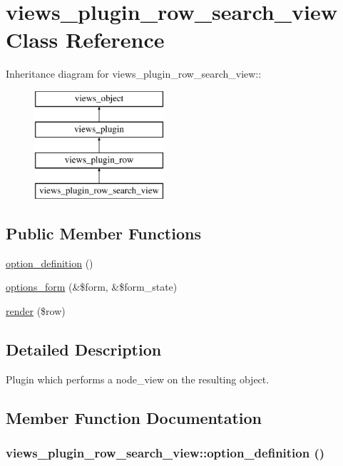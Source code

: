 \hypertarget{classviews__plugin__row__search__view}{
\section{views\_\-plugin\_\-row\_\-search\_\-view Class Reference}
\label{classviews__plugin__row__search__view}
}
Inheritance diagram for views\_\-plugin\_\-row\_\-search\_\-view::\begin{figure}[H]
\begin{center}
\leavevmode
\includegraphics[height=4cm]{classviews__plugin__row__search__view}
\end{center}
\end{figure}
\subsection*{Public Member Functions}
\begin{CompactItemize}
\item 
\hyperlink{classviews__plugin__row__search__view_c0117a0bbff00e4833a081abb564dbf0}{option\_\-definition} ()
\item 
\hyperlink{classviews__plugin__row__search__view_2d2e479f414c487aff3d88343274b49b}{options\_\-form} (\&\$form, \&\$form\_\-state)
\item 
\hyperlink{classviews__plugin__row__search__view_ec0c01f2e90075589b38f73381aa4ce7}{render} (\$row)
\end{CompactItemize}


\subsection{Detailed Description}
Plugin which performs a node\_\-view on the resulting object. 

\subsection{Member Function Documentation}
\hypertarget{classviews__plugin__row__search__view_c0117a0bbff00e4833a081abb564dbf0}{
\subsubsection[{option\_\-definition}]{\setlength{\rightskip}{0pt plus 5cm}views\_\-plugin\_\-row\_\-search\_\-view::option\_\-definition ()}}
\label{classviews__plugin__row__search__view_c0117a0bbff00e4833a081abb564dbf0}


